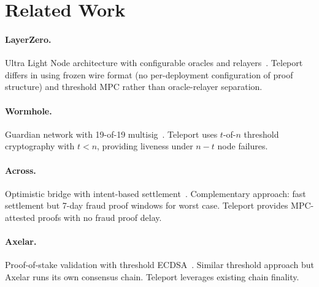 \section{Related Work}

\label{sec:related}

\paragraph{LayerZero.} Ultra Light Node architecture with configurable oracles and relayers~\cite{layerzero}. Teleport differs in using frozen wire format (no per-deployment configuration of proof structure) and threshold MPC rather than oracle-relayer separation.

\paragraph{Wormhole.} Guardian network with 19-of-19 multisig~\cite{wormhole}. Teleport uses $t$-of-$n$ threshold cryptography with $t < n$, providing liveness under $n - t$ node failures.

\paragraph{Across.} Optimistic bridge with intent-based settlement~\cite{across}. Complementary approach: fast settlement but 7-day fraud proof windows for worst case. Teleport provides MPC-attested proofs with no fraud proof delay.

\paragraph{Axelar.} Proof-of-stake validation with threshold ECDSA~\cite{axelar}. Similar threshold approach but Axelar runs its own consensus chain. Teleport leverages existing chain finality.

